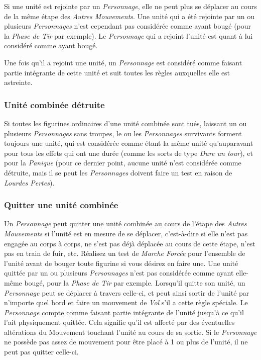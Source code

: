 Si une unité est rejointe par un \emph{Personnage}, elle ne peut plus se déplacer au cours de la même étape des \emph{Autres Mouvements}. Une unité qui a été rejointe par un ou plusieurs \emph{Personnages} n'est cependant pas considérée comme ayant bougé (pour la \emph{Phase de Tir} par exemple). Le \emph{Personnage} qui a rejoint l'unité est quant à lui considéré comme ayant bougé.

Une fois qu'il a rejoint une unité, un \emph{Personnage} est considéré comme faisant partie intégrante de cette unité et suit toutes les règles auxquelles elle est astreinte.

\subsubsection*{Unité combinée détruite}

Si toutes les figurines ordinaires d'une unité combinée sont tués, laissant un ou plusieurs \emph{Personnages} sans troupes, le ou les \emph{Personnages} survivants forment toujours une unité, qui est considérée comme étant la même unité qu'auparavant pour tous les effets qui ont une durée (comme les sorts de type \emph{Dure un tour}), et pour la \emph{Panique} (pour ce dernier point, aucune unité n'est considérée comme détruite, mais il se peut les \emph{Personnages} doivent faire un test en raison de \emph{Lourdes Pertes}).

\subsubsection*{Quitter une unité combinée}

Un \emph{Personnage} peut quitter une unité combinée au cours de l'étape des \emph{Autres Mouvements} si l'unité est en mesure de se déplacer, c'est-à-dire si elle n'est pas engagée au corps à corps, ne s'est pas déjà déplacée au cours de cette étape, n'est pas en train de fuir, etc. Réalisez un test de \emph{Marche Forcée} pour l'ensemble de l'unité avant de bouger toute figurine si vous désirez en faire une. Une unité quittée par un ou plusieurs \emph{Personnages} n'est pas considérée comme ayant elle-même bougé, pour la \emph{Phase de Tir} par exemple. Lorsqu'il quitte son unité, un \emph{Personnage} peut se déplacer à travers celle-ci, et peut ainsi sortir de l'unité par n'importe quel bord et faire un mouvement de \emph{Vol} s'il a cette règle spéciale. Le \emph{Personnage} compte comme faisant partie intégrante de l'unité jusqu'à ce qu'il l'ait physiquement quittée. Cela  signifie qu'il est affecté par des éventuelles altérations du Mouvement touchant l'unité au cours de sa sortie. Si le \emph{Personnage} ne possède pas assez de mouvement pour être placé à 1{\pouce} ou plus de l'unité, il ne peut pas quitter celle-ci. 

